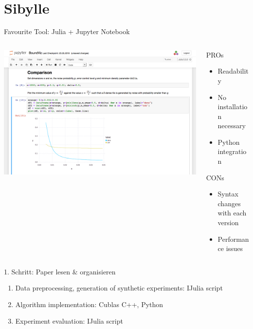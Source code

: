 \documentclass[aspectratio=169,10pt]{beamer}
\begin{document}
\section{Sibylle}
\begin{frame}[fragile]{Favourite Tool: Julia + Jupyter Notebook}
\begin{columns}
\begin{column}{0.7\textwidth}
\includegraphics[width=\textwidth]{julia.png}
\end{column}
\begin{column}{0.25\textwidth}
PROs
\begin{itemize}
    \item Readability
    \item No installation necessary
    \item Python integration
\end{itemize}
CONs
\begin{itemize}
    \item Syntax changes with each version
    \item Performance issues
\end{itemize}
\end{column}
\end{columns}
\end{frame}

\begin{frame}[t,fragile]{1. Schritt: Paper lesen $\&$ organisieren}
\begin{enumerate}
    \item Data preprocessing, generation of synthetic experiments: IJulia script
    \item Algorithm implementation: Cublas C++, Python
    \item Experiment evaluation: IJulia script
\end{enumerate}
\end{frame}
\end{document}
